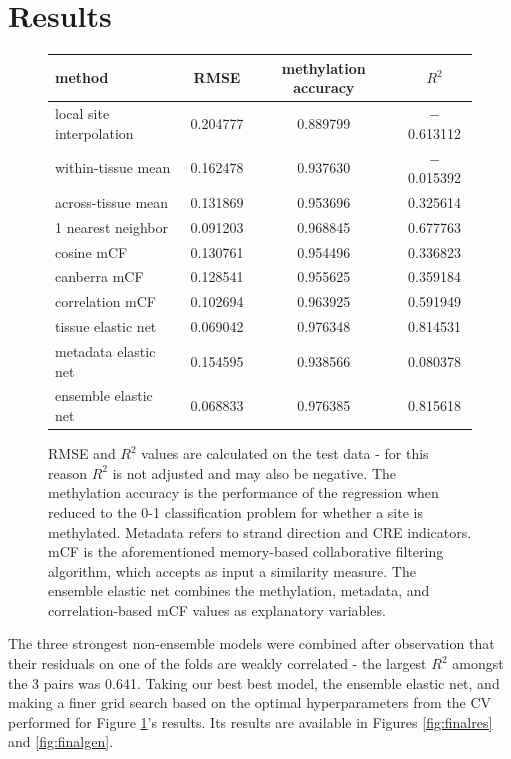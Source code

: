 \documentclass{article} %
\begin{document}

\section{Results}

\begin{figure}[H]
    \centering
    \begin{tabular}{l|ccc}
method & RMSE & methylation accuracy & $R^2$ \\ \hline
local site interpolation & 0.204777 & 0.889799 & $-$0.613112 \\
within-tissue mean & 0.162478 & 0.937630 & $-$0.015392 \\
across-tissue mean & 0.131869 & 0.953696 & \phantom{$-$}0.325614 \\
1 nearest neighbor & 0.091203 & 0.968845 & \phantom{$-$}0.677763 \\
cosine mCF & 0.130761 & 0.954496 & \phantom{$-$}0.336823 \\
canberra mCF & 0.128541 & 0.955625 & \phantom{$-$}0.359184 \\
correlation mCF & 0.102694 & 0.963925 & \phantom{$-$}0.591949 \\
tissue elastic net & 0.069042 & 0.976348 & \phantom{$-$}0.814531 \\
metadata elastic net & 0.154595 & 0.938566 & \phantom{$-$}0.080378 \\
ensemble elastic net & 0.068833 & 0.976385 & \phantom{$-$}0.815618
    \end{tabular}
    \caption{RMSE and $R^2$ values are calculated on the test data - for this reason $R^2$ is not adjusted and may also be negative. The methylation accuracy is the performance of the regression when reduced to the 0-1 classification problem for whether a site is methylated. Metadata refers to strand direction and CRE indicators. mCF is the aforementioned memory-based collaborative filtering algorithm, which accepts as input a similarity measure. The ensemble elastic net combines the methylation, metadata, and correlation-based mCF values as explanatory variables.}
    \label{fig:cvperf}
\end{figure} 

The three strongest non-ensemble models were combined after observation that their residuals on one of the folds are weakly correlated - the largest $R^2$ amongst the 3 pairs was 0.641. Taking our best best model, the ensemble elastic net, and making a finer grid search based on the optimal hyperparameters from the CV performed for Figure \ref{fig:cvperf}'s results. Its results are available in Figures \ref{fig:finalres} and \ref{fig:finalgen}.
\end{document}
